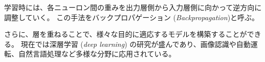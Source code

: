 \documentclass[titlepage,12pt]{jreport}
\begin{document}
学習時には、各ニューロン間の重みを出力層側から入力層側に向かって逆方向に調整していく。 この手法をバックプロパゲーション ({\it Backpropagation})と呼ぶ。

さらに、層を重ねることで、様々な目的に適応するモデルを構築することができる。 現在では深層学習 ({\it deep learning}) の研究が盛んであり、画像認識や自動運転、自然言語処理など多様な分野に応用されている。

\end{document}
